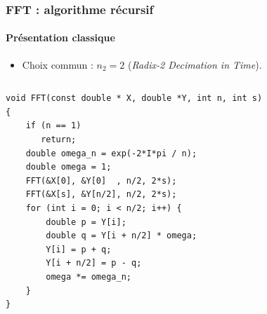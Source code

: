 \documentclass[xcolor={x11names,svgnames}]{beamer}
\begin{document}

\begin{frame}[fragile]
  \frametitle{FFT : algorithme récursif}
  \framesubtitle{Présentation classique}

  \begin{itemize}
  \item Choix commun : $n_2 = 2$ (\og \textit{Radix-2 Decimation in Time}\fg).
  \end{itemize}

  \begin{columns}[T]
    \begin{column}{8cm}
      
\begin{verbatim}
void FFT(const double * X, double *Y, int n, int s)
{
    if (n == 1)
       return;
    double omega_n = exp(-2*I*pi / n);
    double omega = 1;
    FFT(&X[0], &Y[0]  , n/2, 2*s);
    FFT(&X[s], &Y[n/2], n/2, 2*s);
    for (int i = 0; i < n/2; i++) {
        double p = Y[i];
        double q = Y[i + n/2] * omega;
        Y[i] = p + q;
        Y[i + n/2] = p - q;
        omega *= omega_n;    
    }
}
\end{verbatim}

    \end{column}
    \begin{column}{1.6cm}
    
\end{column}
\end{columns}
\end{frame}

\end{document}
